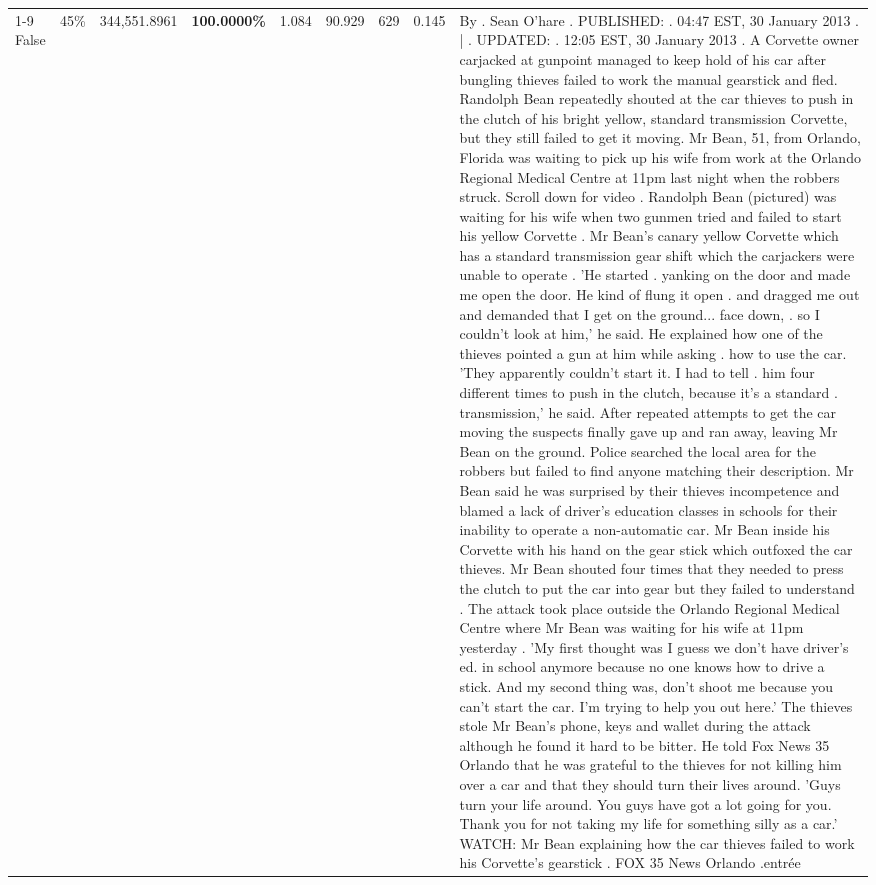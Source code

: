 \begin{table}[H]
\begin{tabular}{lllrlllll}
\cline{1-9} \cline{2-9}
False & 45\% & 344,551.8961 & \bfseries \color{red} 100.0000\% & 1.084 & 90.929 & 629 & 0.145 & By . Sean O'hare . PUBLISHED: . 04:47 EST, 30 January 2013 . | . UPDATED: . 12:05 EST, 30 January 2013 . A Corvette owner carjacked at gunpoint managed to keep hold of his car after bungling thieves failed to work the manual gearstick and fled. Randolph Bean repeatedly shouted at the car thieves to push in the clutch of his bright yellow, standard transmission Corvette, but they still failed to get it moving. Mr Bean, 51, from Orlando, Florida was waiting to pick up his wife from work at the Orlando Regional Medical Centre at 11pm last night when the robbers struck. Scroll down for video . Randolph Bean (pictured) was waiting for his wife when two gunmen tried and failed to start his yellow Corvette . Mr Bean's canary yellow Corvette which has a standard transmission gear shift which the carjackers were unable to operate . 'He started . yanking on the door and made me open the door. He kind of flung it open . and dragged me out and demanded that I get on the ground... face down, . so I couldn't look at him,' he said. He explained how one of the thieves pointed a gun at him while asking . how to use the car. 'They apparently couldn't start it. I had to tell . him four different times to push in the clutch, because it's a standard . transmission,' he said. After repeated attempts to get the car moving the suspects finally gave up and ran away, leaving Mr Bean on the ground. Police searched the local area for the robbers but failed to find anyone matching their description. Mr Bean said he was surprised by their thieves incompetence and blamed a lack of driver's education classes in schools for their inability to operate a non-automatic car. Mr Bean inside his Corvette with his hand on the gear stick which outfoxed the car thieves. Mr Bean shouted four times that they needed to press the clutch to put the car into gear but they failed to understand . The attack took place outside the Orlando Regional Medical Centre where Mr Bean was waiting for his wife at 11pm yesterday . 'My first thought was I guess we don't have driver's ed. in school anymore because no one knows how to drive a stick. And my second thing was, don't shoot me because you can't start the car. I'm trying to help you out here.' The thieves stole Mr Bean's phone, keys and wallet during the attack although he found it hard to be bitter. He told Fox News 35 Orlando that he was grateful to the thieves for not killing him over a car and that they should turn their lives around. 'Guys turn your life around. You guys have got a lot going for you. Thank you for not taking my life for something silly as a car.' WATCH: Mr Bean explaining how the car thieves failed to work his Corvette's gearstick . FOX 35 News Orlando .entrée \\

\end{tabular}
\end{table}
